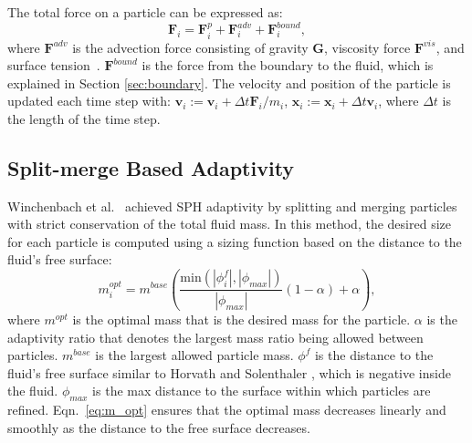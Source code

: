\documentclass[VANCOUVER,STIX1COL]{WileyNJD-v2}
\begin{document}
The total force on a particle can be expressed as:
\begin{equation}
    \mathbf{F}_i = \mathbf{F}_i^p + \mathbf{F}_i^{adv} + \mathbf{F}_i^{bound},
\end{equation}
where $\mathbf{F}^{adv}$ is the advection force consisting of gravity $\mathbf{G}$, viscosity force $\mathbf{F}^{vis}$, and surface tension~\cite{Akinci13}. $\mathbf{F}^{bound}$ is the force from the boundary to the fluid, which is explained in Section \ref{sec:boundary}. The velocity and position of the particle is updated each time step with: $\mathbf{v}_i := \mathbf{v}_i + \Delta t \mathbf{F}_i / m_i$, $\mathbf{x}_i := \mathbf{x}_i + \Delta t \mathbf{v}_i$, where $\Delta t$ is the length of the time step.

\subsection{Split-merge Based Adaptivity}

Winchenbach et al.~\cite{Winchenbach17} achieved SPH adaptivity by splitting and merging particles with strict conservation of the total fluid mass. In this method, the desired size for each particle is computed using a sizing function based on the distance to the fluid's free surface:
\begin{equation}
    m_i^{opt} = m^{base}\left(
    \frac{\mathrm{min}(|\phi_i^f|,|\phi_{max}|)}{|\phi_{max}|}
    (1 - \alpha) + \alpha
    \right),
    \label{eq:m_opt}
\end{equation}
where $m^{opt}$ is the optimal mass that is the desired mass for the particle. $\alpha$ is the adaptivity ratio that denotes the largest mass ratio being allowed between particles. $m^{base}$ is the largest allowed particle mass. $\phi^f$ is the distance to the fluid's free surface similar to Horvath and Solenthaler \cite{Horvath13}, which is negative inside the fluid. $\phi_{max}$ is the max distance to the surface within which particles are refined. Eqn.~\ref{eq:m_opt} ensures that the optimal mass decreases linearly and smoothly as the distance to the free surface decreases.
\end{document}
